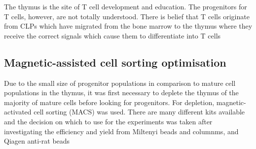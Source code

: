 The thymus is the site of T cell development and education.
The progenitors for T cells, however, are not totally understood. 
There is belief that T cells originate from CLPs which have migrated from the bone marrow to the thymus where they receive the correct signals which cause them to differentiate into T cells
\subsection{Magnetic-assisted cell sorting optimisation}

Due to the small size of progenitor populations in comparison to mature cell populations in the thymus, it was first necessary to deplete the thymus of the majority of mature cells before looking for progenitors.
For depletion, magnetic-activated cell sorting (MACS) was used.
There are many different kits available and the decision on which to use for the experiments was taken after investigating the efficiency and yield from Miltenyi beads and columnms, and Qiagen anti-rat beads 

